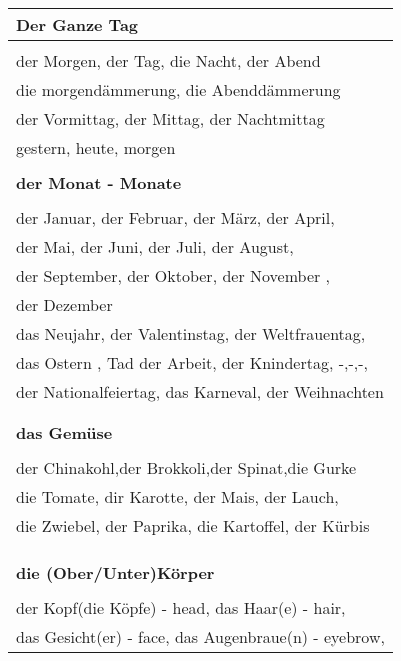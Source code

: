 \documentclass[12pt]{article}
\begin{document}
\begin{multicols}{2}
\begin{tabular}{l}
		\textbf{Der Ganze Tag}                                \\
		\hline                                                \\
		der Morgen, der Tag, die Nacht, der Abend             \\
		die morgendämmerung, die Abenddämmerung               \\
		der Vormittag, der Mittag, der Nachtmittag            \\
		gestern, heute, morgen                                \\
		\\
		\textbf{der Monat - Monate}                           \\
		\hline                                                \\
		der Januar, der Februar,   der März, der April,       \\
		der Mai, der Juni, der Juli, der August,              \\
		der September, der Oktober, der November ,            \\
		der Dezember                                          \\
		das Neujahr, der Valentinstag, der Weltfrauentag,     \\
		das Ostern , Tad der Arbeit,   der Knindertag, -,-,-, \\
		der Nationalfeiertag,  das Karneval,  der Weihnachten \\
		\\
		\\
		\textbf{das Gemüse}                                   \\
		\hline                                                \\
		der Chinakohl,der Brokkoli,der Spinat,die Gurke       \\
		die Tomate, dir Karotte, der Mais, der Lauch,         \\
		die Zwiebel, der Paprika, die Kartoffel, der Kürbis   \\
		\\
		\\
		\\
		\textbf{die (Ober/Unter)Körper}                       \\
		\hline                                                \\
		der Kopf(die Köpfe) - head, das Haar(e) - hair,       \\
		das Gesicht(er) - face, das Augenbraue(n) - eyebrow,  \\

\end{tabular}
\end{multicols}
\end{document}
